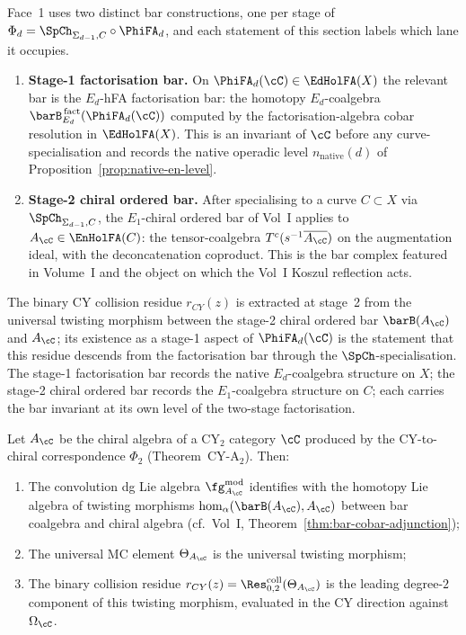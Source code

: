 \begin{remark}
\label{rem:face1-two-bars}
Face~1 uses two distinct bar constructions, one per stage of
$\Phi_d = \SpCh_{\Sigma_{d-1}, C} \circ \PhiFA_d$, and each statement
of this section labels which lane it occupies.
\begin{enumerate}[label=\textup{(\roman*)}]
\item \textbf{Stage-1 factorisation bar.} On $\PhiFA_d(\cC) \in \EdHolFA(X)$
the relevant bar is the $E_d$-hFA factorisation bar: the homotopy
$E_d$-coalgebra $\barB^{\,\mathrm{fact}}_{E_d}(\PhiFA_d(\cC))$ computed by
the factorisation-algebra cobar resolution in $\EdHolFA(X)$. This is an
invariant of $\cC$ before any curve-specialisation and records the native
operadic level $n_{\mathrm{native}}(d)$ of
Proposition~\ref{prop:native-en-level}.
\item \textbf{Stage-2 chiral ordered bar.} After specialising to a curve
$C \subset X$ via $\SpCh_{\Sigma_{d-1}, C}$, the $E_1$-chiral ordered bar
of Vol~I applies to $A_\cC \in \EnHolFA(C)$: the tensor-coalgebra
$T^c(s^{-1} \overline{A_\cC})$ on the augmentation ideal, with the
deconcatenation coproduct. This is the bar complex featured in Volume~I
and the object on which the Vol~I Koszul reflection acts.
\end{enumerate}
The binary CY collision residue $r_{CY}(z)$ is extracted at stage~2 from
the universal twisting morphism between the stage-2 chiral ordered bar
$\barB(A_\cC)$ and $A_\cC$; its existence as a stage-1 aspect of
$\PhiFA_d(\cC)$ is the statement that this residue descends from the
factorisation bar through the $\SpCh$-specialisation. The stage-1
factorisation bar records the native $E_d$-coalgebra structure on $X$;
the stage-2 chiral ordered bar records the $E_1$-coalgebra structure
on $C$; each carries the bar invariant at its own level of the
two-stage factorisation.
\end{remark}

\begin{theorem}[Face 1: CY bar-cobar realization, \texorpdfstring{$d = 2$}{d = 2}]
\label{thm:face1-cy-bar-cobar}
Let $A_\cC$ be the chiral algebra of a CY$_2$ category $\cC$ produced by
the CY-to-chiral correspondence $\Phi_2$ (Theorem~CY-A$_2$). Then:
\begin{enumerate}[label=(\roman*)]
\item The convolution dg Lie algebra $\fg^{\mathrm{mod}}_{A_\cC}$
identifies with the homotopy Lie algebra of twisting morphisms
$\mathrm{hom}_\alpha(\barB(A_\cC), A_\cC)$ between bar coalgebra and
chiral algebra (cf.\ Vol~I,
Theorem~\ref{thm:bar-cobar-adjunction});
\item The universal MC element $\Theta_{A_\cC}$ is the universal
twisting morphism;
\item The binary collision residue $r_{CY}(z) =
\Res^{\mathrm{coll}}_{0,2}(\Theta_{A_\cC})$ is the leading
degree-$2$ component of this twisting morphism, evaluated in the
CY direction against $\Omega_\cC$.
\end{enumerate}
\end{theorem}


